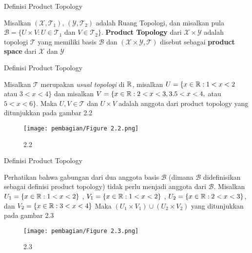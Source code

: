 \begin{frame}{Definisi Product Topology}
    \begin{tcolorbox}[title=Definisi]
        Misalkan $(\mathcal{X},\mathcal{T}_1)$, $(\mathcal{Y},\mathcal{T}_2)$ adalah Ruang Topologi, dan misalkan pula $\mathcal{B} = \{U \times V : U \in \mathcal{T}_{1} $ dan $ V \in \mathcal{T}_{2}\} $. \textbf{Product Topology} dari $\mathcal{X}\times \mathcal{Y}$ adalah topologi $\mathcal{T}$ yang memiliki basis $\mathcal{B}$ dan $(\mathcal{X} \times \mathcal{Y}, \mathcal{T})$ disebut sebagai \textbf{product space} dari $\mathcal{X}$ dan $\mathcal{Y}$
    \end{tcolorbox}
    \end{frame}
    
    
    \begin{frame}{Definisi Product Topology}
    \begin{tcolorbox}[title=Example 7]
        Misalkan $\mathcal{T}$ merupakan \textit{usual topologi} di $\mathbb{R}$, misalkan $U = \{ x \in \mathbb{R} : 1 < x < 2 $ atau $ 3 < x <4 \}$ dan misalkan $V = \{x \in \mathbb{R} : 2 < x < 3, 3.5 < x < 4, $ atau $ 5 < x < 6\}$. Maka $U,V \in \mathcal{T}$ dan $U \times V$ adalah anggota dari product topology yang ditunjukkan pada gambar 2.2
    
    \begin{figure}
        \centering
        \texttt{[image: pembagian/Figure 2.2.png]}
        \caption{2.2}
        \label{fig:enter-label}
    \end{figure}
    \end{tcolorbox}
    \end{frame}
    
    \begin{frame}{Definisi Product Topology}
    \begin{tcolorbox}[title=Catatan ]
        Perhatikan bahwa gabungan dari dua anggota basis $\mathcal{B}$ (dimana $\mathcal{B}$ didefinisikan sebagai definisi product topology) tidak perlu menjadi anggota dari $\mathcal{B}$. Misalkan $U_1 = \{x \in \mathbb{R} : 1 < x < 2\}$ , $V_1 = \{x \in \mathbb{R} : 1 < x < 2\}$ , $U_2 = \{x \in \mathbb{R} : 2 < x < 3\}$, dan $V_2= \{ x \in \mathbb{R} : 3 < x < 4\}$ Maka $(U_1 \times V_1) \cup (U_2 \times V_2)$ yang ditunjukkan pada gambar 2.3
    
    \begin{figure}
        \centering
        \texttt{[image: pembagian/Figure 2.3.png]}
        \caption{2.3}
        \label{fig:enter-label}
    \end{figure}
    \end{tcolorbox}
    \end{frame}
    
